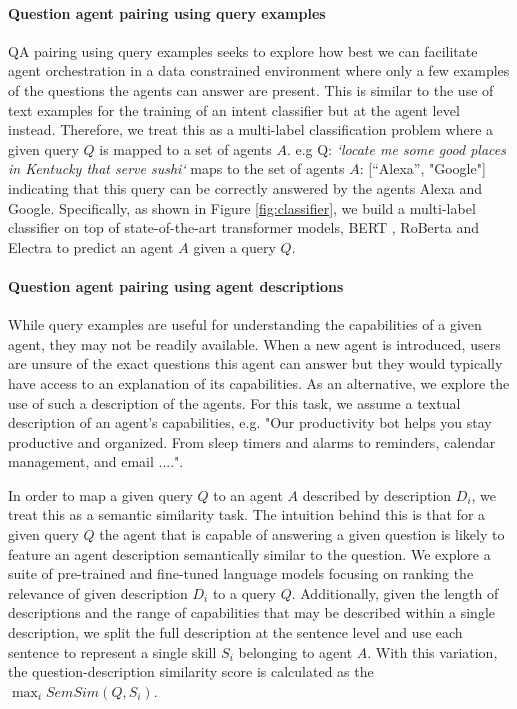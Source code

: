 \documentclass[11pt]{article}
\begin{document}
\paragraph{Question agent pairing using query examples}
QA pairing using query examples seeks to explore how best we can facilitate agent orchestration in a data constrained environment where only a few examples of the questions the agents can answer are present. This is similar to the use of text examples for the training of an intent classifier but at the agent level instead. Therefore, we treat this as a multi-label classification problem where a given query $Q$ is mapped to a set of agents $A$. e.g Q: \emph{`locate me some good places in Kentucky that serve sushi`} maps to the set of agents $A$: [“Alexa”, "Google"] indicating that this query can be correctly answered by the agents Alexa and Google. Specifically, as shown in Figure \ref{fig:classifier}, we build a multi-label classifier on top of state-of-the-art transformer models, BERT \cite{devlin-etal-2019-bert}, RoBerta \cite{liu2019roberta} and Electra \cite{clark2020electra} to predict an agent $A$ given a query $Q$.






\paragraph{Question agent pairing using agent descriptions}
While query examples are useful for understanding the capabilities of a given agent, they may not be readily available. When a new agent is introduced, users are unsure of the exact questions this agent can answer but they would typically have access to an explanation of its capabilities. As an alternative, we explore the use of such a description of the agents.
For this task, we assume a textual description of an agent's capabilities, e.g. "Our productivity bot helps you stay productive and organized. From sleep timers and alarms to reminders, calendar management, and email ....".

In order to map a given query $Q$ to an agent $A$ described by description $D_{i}$, we treat this as a semantic similarity task. The intuition behind this is that for a given query $Q$ the agent that is capable of answering a given question is likely to feature an agent description semantically similar to the question. We explore a suite of pre-trained and fine-tuned language models focusing on ranking the relevance of given description $D_{i}$ to a query $Q$. Additionally, given the length of descriptions and the range of capabilities that may be described within a single description, we split the full description at the sentence level and use each sentence to represent a single skill $S_{i}$ belonging to agent $A$. With this variation, the question-description similarity score is calculated as the $\max_i{SemSim(Q, S_{i})}$.
\end{document}
